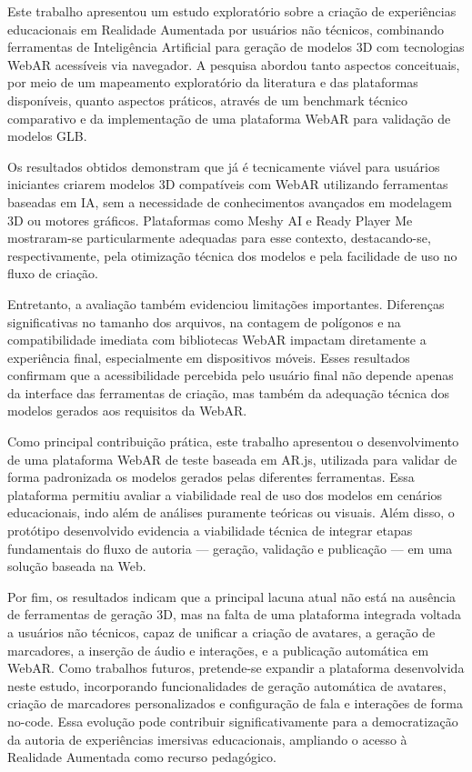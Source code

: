 \documentclass[conference]{IEEEtran}
\begin{document}
Este trabalho apresentou um estudo exploratório sobre a criação de experiências educacionais em Realidade Aumentada por usuários não técnicos, combinando ferramentas de Inteligência Artificial para geração de modelos 3D com tecnologias WebAR acessíveis via navegador. A pesquisa abordou tanto aspectos conceituais, por meio de um mapeamento exploratório da literatura e das plataformas disponíveis, quanto aspectos práticos, através de um benchmark técnico comparativo e da implementação de uma plataforma WebAR para validação de modelos GLB.

Os resultados obtidos demonstram que já é tecnicamente viável para usuários iniciantes criarem modelos 3D compatíveis com WebAR utilizando ferramentas baseadas em IA, sem a necessidade de conhecimentos avançados em modelagem 3D ou motores gráficos. Plataformas como Meshy AI e Ready Player Me mostraram-se particularmente adequadas para esse contexto, destacando-se, respectivamente, pela otimização técnica dos modelos e pela facilidade de uso no fluxo de criação.

Entretanto, a avaliação também evidenciou limitações importantes. Diferenças significativas no tamanho dos arquivos, na contagem de polígonos e na compatibilidade imediata com bibliotecas WebAR impactam diretamente a experiência final, especialmente em dispositivos móveis. Esses resultados confirmam que a acessibilidade percebida pelo usuário final não depende apenas da interface das ferramentas de criação, mas também da adequação técnica dos modelos gerados aos requisitos da WebAR.

Como principal contribuição prática, este trabalho apresentou o desenvolvimento de uma plataforma WebAR de teste baseada em AR.js, utilizada para validar de forma padronizada os modelos gerados pelas diferentes ferramentas. Essa plataforma permitiu avaliar a viabilidade real de uso dos modelos em cenários educacionais, indo além de análises puramente teóricas ou visuais. Além disso, o protótipo desenvolvido evidencia a viabilidade técnica de integrar etapas fundamentais do fluxo de autoria — geração, validação e publicação — em uma solução baseada na Web.

Por fim, os resultados indicam que a principal lacuna atual não está na ausência de ferramentas de geração 3D, mas na falta de uma plataforma integrada voltada a usuários não técnicos, capaz de unificar a criação de avatares, a geração de marcadores, a inserção de áudio e interações, e a publicação automática em WebAR. Como trabalhos futuros, pretende-se expandir a plataforma desenvolvida neste estudo, incorporando funcionalidades de geração automática de avatares, criação de marcadores personalizados e configuração de fala e interações de forma no-code. Essa evolução pode contribuir significativamente para a democratização da autoria de experiências imersivas educacionais, ampliando o acesso à Realidade Aumentada como recurso pedagógico.



\end{document}

